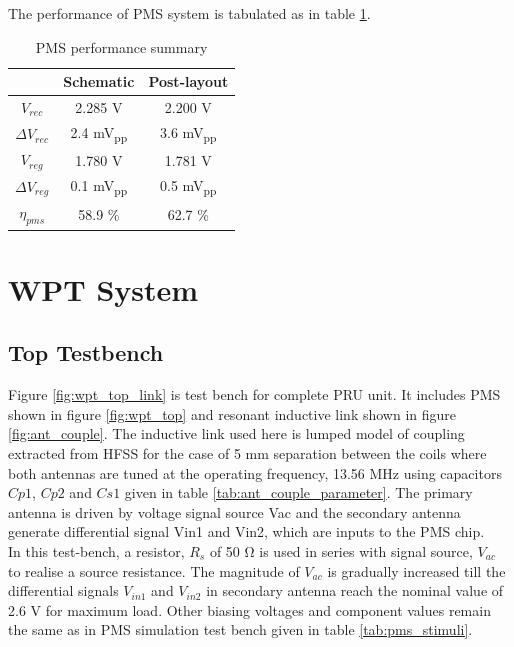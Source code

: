 \documentclass[12pt,a4paper,UKenglish]{report}
\begin{document}
The performance of PMS system is tabulated as in table \ref{tab:pms_spec}.
\begin{table}[H]
\caption{PMS performance summary} 
\begin{center}
\begin{tabular}{c|c|c}
\hline \hline
			& \textbf{Schematic}	& \textbf{Post-layout} 	\\
\hline \hline
$V_{rec}$ 			& 2.285 \si{\volt}		& 2.200 V	\\ \hline
$\Delta V_{rec}$	& 2.4 \si{\milli\volt}\textsubscript{pp} & 3.6 \si{\milli\volt}\textsubscript{pp}		\\ \hline
$V_{reg}$			& 1.780	\si{\volt}		& 1.781 \si{\volt}			\\ \hline
$\Delta V_{reg}$ 	& 0.1 \si{\milli\volt}\textsubscript{pp} & 0.5 \si{\milli\volt}\textsubscript{pp}		\\ \hline
$\eta_{pms}$		& 	58.9  \%	& 62.7  \%		\\ 
 
\hline \hline
\end{tabular}
\end{center}
\label{tab:pms_spec}
\end{table}%

\section{WPT System} 
\subsection{Top Testbench} %

Figure \ref{fig:wpt_top_link} is test bench for complete PRU unit. It includes PMS shown in figure \ref{fig:wpt_top} and resonant inductive link shown in figure \ref{fig:ant_couple}. The inductive link used here is lumped model of coupling extracted from HFSS for the case of 5 mm separation between the coils where both antennas are tuned at the operating frequency, 13.56 MHz using capacitors $Cp1$, $Cp2$ and $Cs1$ given in table \ref{tab:ant_couple_parameter}. The primary antenna is driven by voltage signal source Vac and the secondary antenna generate differential signal Vin1 and Vin2, which are inputs to the PMS chip. \\

In this test-bench, a resistor, $R_{s}$ of  50 \si{\ohm} is used in series with signal source, $V_{ac}$ to realise a 
source resistance. The magnitude of $V_{ac}$ is gradually increased till the differential signals $V_{in1}$ and $V_{in2}$ 
in secondary antenna reach the nominal value of 2.6 \si{\volt} for maximum load. Other biasing voltages and component 
values remain the same as in PMS simulation test bench given in table \ref{tab:pms_stimuli}. \\
\end{document}
